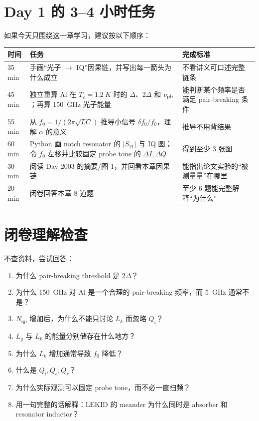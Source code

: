 \documentclass[11pt,a4paper,openany]{ctexrep}
\newcommand{\qp}{\mathrm{qp}}
\begin{document}
\section{Day 1 的 3--4 小时任务}
如果今天只围绕这一章学习，建议按以下顺序：

\begin{tabularx}{\textwidth}{p{1.8cm} X X}
\toprule
时间 & 任务 & 完成标准 \\
\midrule
35 min & 手画“光子 $\rightarrow$ IQ”因果链，并写出每一箭头为什么成立 & 不看讲义可口述完整链条 \\
45 min & 独立重算 Al 在 $T_c=\SI{1.2}{K}$ 时的 $\Delta$、$2\Delta$ 和 $\nu_{\rm pb}$；再算 \SI{150}{GHz} 光子能量 & 能判断某个频率是否满足 pair-breaking 条件 \\
55 min & 从 $f_0=1/(2\pi\sqrt{LC})$ 推导小信号 $\delta f_0/f_0$，理解 $\alpha$ 的意义 & 推导不用背结果 \\
60 min & Python 画 notch resonator 的 $|S_{21}|$ 与 IQ 圆；令 $f_0$ 左移并比较固定 probe tone 的 $\Delta I,\Delta Q$ & 得到至少 3 张图 \\
30 min & 阅读 Day 2003 的摘要/图 1，并回看本章因果链 & 能指出论文实验的“被测量量”在哪里 \\
20 min & 闭卷回答本章 8 道题 & 至少 6 题能完整解释“为什么” \\
\bottomrule
\end{tabularx}

\section{闭卷理解检查}
\begin{checkpointbox}
不查资料，尝试回答：
\begin{enumerate}
  \item 为什么 pair-breaking threshold 是 $2\Delta$？
  \item 为什么 \SI{150}{GHz} 对 Al 是一个合理的 pair-breaking 频率，而 \SI{5}{GHz} 通常不是？
  \item $N_{\qp}$ 增加后，为什么不能只讨论 $L_k$ 而忽略 $Q_i$？
  \item $L_g$ 与 $L_k$ 的能量分别储存在什么地方？
  \item 为什么 $L_k$ 增加通常导致 $f_0$ 降低？
  \item 什么是 $Q_i,Q_c,Q_r$？
  \item 为什么实际观测可以固定 probe tone，而不必一直扫频？
  \item 用一句完整的话解释：LEKID 的 meander 为什么同时是 absorber 和 resonator inductor？
\end{enumerate}
\end{checkpointbox}
\end{document}
